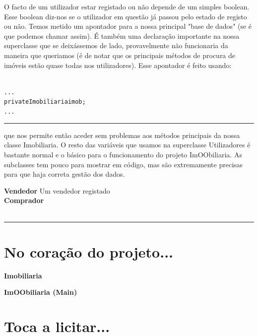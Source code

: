 \documentclass[12pt]{article}
\newenvironment{code}                    
{\textbf{
} \hspace{1cm} \hrulefill \\ 
\smallskip 
\begin{center}
\begin{minipage}{0.9\textwidth} 
\begin{alltt}\small}
{\end{alltt}
\end{minipage}
\end{center}
\hrule\smallskip
}
\begin{document}
O facto de um utilizador estar registado ou não depende de um simples boolean.\\ 
Esse boolean diz-nos se o utilizador em questão já passou pelo estado de registo ou não.
\newline
Temos metido um apontador para a nossa principal "base de dados" (se é que podemos chamar assim). 
É também uma declaração importante na nossa superclasse que se deixássemos de lado, provavelmente não funcionaria da maneira que queriamos (é de notar que os principais métodos de procura de imóveis estão quase todas nos utilizadores).
\newline
Esse apontador é feito usando:
~\\
\begin{code}
...
    private Imobiliaria imob;
...
\end{code}
que nos permite então aceder sem problemas aos métodos principais da nossa classe Imobiliaria.
\newline
O resto das variáveis que usamos na superclasse Utilizadores é bastante normal e o básico para o funcionamento do projeto ImOObiliaria.
\newline
As subclasses tem pouco para mostrar em código, mas são extremamente precisas para que haja correta gestão dos dados.
\pagebreak

\textbf{Vendedor}
Um vendedor registado  \\

\textbf{Comprador}
\\

\begin{code}

\end{code}



\section{No coração do projeto...}

\textbf{Imobiliaria}



\pagebreak

\textbf{ImOObiliaria (Main)}

\section{Toca a licitar...}
\end{document}
